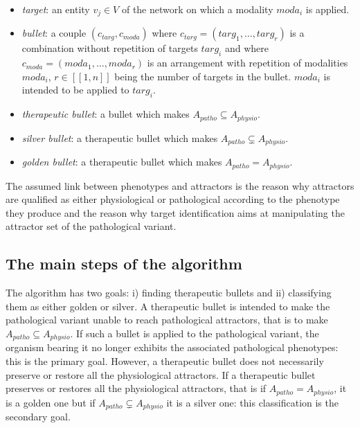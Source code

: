 \documentclass[oneside,a4paper,onecolumn,notitlepage]{article}
\begin{document}
\begin{itemize}
\item \emph{target}: an entity $v_j\in V$ of the network on which a modality $moda_i$ is applied.
\item \emph{bullet}: a couple $(c_{targ},c_{moda})$ where $c_{targ}=(targ_1,\dots,targ_r)$ is a combination without repetition of targets $targ_i$ and where $c_{moda}=(moda_1,\dots,moda_r)$ is an arrangement with repetition of modalities $moda_i$, $r\in [\![1,n]\!]$ being the number of targets in the bullet. $moda_i$ is intended to be applied to $targ_i$.
\item \emph{therapeutic bullet}: a bullet which makes $A_{patho}\subseteq A_{physio}$.
\item \emph{silver bullet}: a therapeutic bullet which makes $A_{patho}\varsubsetneq A_{physio}$.
\item \emph{golden bullet}: a therapeutic bullet which makes $A_{patho}=A_{physio}$.
\end{itemize}

The assumed link between phenotypes and attractors is the reason why attractors are qualified as either physiological or pathological according to the phenotype they produce and the reason why target identification aims at manipulating the attractor set of the pathological variant.

\subsection*{The main steps of the algorithm}
The algorithm has two goals: i) finding therapeutic bullets and ii) classifying them as either golden or silver. A therapeutic bullet is intended to make the pathological variant unable to reach pathological attractors, that is to make $A_{patho}\subseteq A_{physio}$. If such a bullet is applied to the pathological variant, the organism bearing it no longer exhibits the associated pathological phenotypes: this is the primary goal. However, a therapeutic bullet does not necessarily preserve or restore all the physiological attractors. If a therapeutic bullet preserves or restores all the physiological attractors, that is if $A_{patho}=A_{physio}$, it is a golden one but if $A_{patho}\varsubsetneq A_{physio}$ it is a silver one: this classification is the secondary goal.
\end{document}
